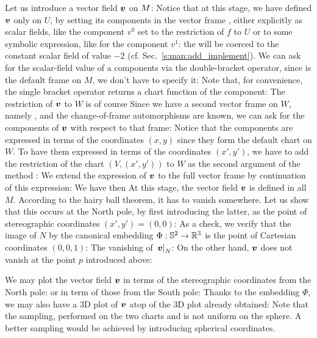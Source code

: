 Let us introduce a vector field $\bm{v}$ on $M$:
Notice that at this stage, we have defined $\bm{v}$ only on $U$, by setting
its components in the vector frame , either explicitly as scalar
fields, like the component $v^0$ set to the restriction of $f$ to $U$ or
to some symbolic expression, like for the component $v^1$: the 
will be coerced to the constant scalar field of value $-2$ (cf. Sec.~\ref{s:man:add_implement}).
We can ask for the scalar-field value of a components via the double-bracket
operator, since  is the default frame on $M$, we don't have to specify
it:
Note that, for convenience, the single bracket operator returns a chart function
of the component:
The restriction of $\bm{v}$ to $W$ is of course
Since we have a second vector frame on $W$, namely , and the
change-of-frame automorphisms are known, we can ask for the components
of $\bm{v}$ with respect to that frame:
Notice that the components are expressed in terms of the coordinates $(x,y)$
since they form the default chart on $W$. To have them expressed in
terms of the coordinates $(x',y')$, we have to add the restriction of
the chart
$(V,(x',y'))$ to $W$ as the second argument of the method
:
We extend the expression of $\bm{v}$ to the full vector frame 
by continuation of this expression:
We have then
At this stage, the vector field $\bm{v}$ is defined in all $M$.
According to the hairy ball theorem, it has to vanish somewhere.
Let us show that this occurs at the North pole, by first introducing the
latter, as the point of stereographic coordinates $(x',y')=(0,0)$:
As a check, we verify that the image of $N$ by the canonical embedding
$\Phi: \mathbb{S}^2 \to \mathbb{R}^3$ is the point of Cartesian coordinates $(0,0,1)$:
The vanishing of $\left.\bm{v}\right| _N$:
On the other hand, $\bm{v}$ does not vanish at the point $p$ introduced above:

We may plot the vector field $\bm{v}$ in terms of the stereographic coordinates
from the North pole:
or in term of those from the South pole:
Thanks to the embedding $\Phi$, we may also have a 3D plot of $\bm{v}$
atop of the 3D plot already obtained:
Note that the sampling, performed on the two charts  and 
is not uniform on the sphere. A better sampling would be achieved by introducing
spherical coordinates.

